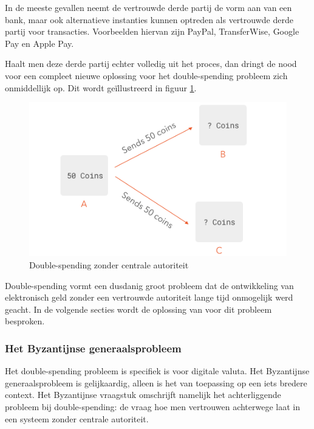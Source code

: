 			In de meeste gevallen neemt de vertrouwde derde partij de vorm aan van een bank, maar ook alternatieve instanties kunnen optreden als vertrouwde derde partij voor transacties. Voorbeelden hiervan zijn PayPal, TransferWise, Google Pay en Apple Pay.
		
			Haalt men deze derde partij echter volledig uit het proces, dan dringt de nood voor een compleet nieuwe oplossing voor het double-spending probleem zich onmiddellijk op.  Dit wordt geïllustreerd in figuur \ref{fig:double_spending1}.
			
			\begin{figure}
				\includegraphics[width=\linewidth]{img/double_spending1.png}
				\caption{Double-spending zonder centrale autoriteit~\autocite{Peyrott2017}}
				\label{fig:double_spending1}
			\end{figure}
		
			Double-spending vormt een dusdanig groot probleem dat  de ontwikkeling van elektronisch geld zonder een vertrouwde autoriteit lange tijd onmogelijk werd geacht. In de volgende secties wordt de oplossing van \textcite{Nakamoto2008} voor dit probleem besproken. 
			
			\subsubsection{Het Byzantijnse generaalsprobleem}
			Het double-spending probleem is specifiek is voor digitale valuta. Het Byzantijnse generaalsprobleem is gelijkaardig, alleen is het van toepassing op een iets bredere context. Het Byzantijnse vraagstuk omschrijft namelijk het achterliggende probleem bij double-spending: de vraag hoe men vertrouwen achterwege laat in een systeem zonder centrale autoriteit.
			
